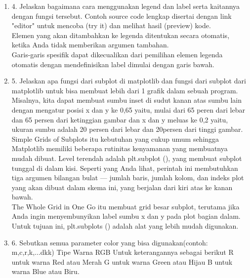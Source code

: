 \begin{enumerate}
\item 4. Jelaskan bagaimana cara menggunakan legend dan label serta kaitannya dengan fungsi tersebut.
Contoh source code lengkap disertai dengan link "editor" untuk mencoba (try it) dan melihat hasil (preview) kode.\\

Elemen yang akan ditambahkan ke legenda ditentukan secara otomatis, ketika Anda tidak memberikan argumen tambahan.\\

Garis-garis spesifik dapat dikecualikan dari pemilihan elemen legenda otomatis dengan mendefinisikan label dimulai dengan garis bawah.\\

\item 5. Jelaskan apa fungsi dari subplot di matplotlib dan fungsi dari subplot dari matplotlib untuk bisa membuat lebih dari 1 grafik dalam sebuah program.\\

Misalnya, kita dapat membuat sumbu inset di sudut kanan atas sumbu lain dengan mengatur posisi x dan y ke 0,65 yaitu, mulai dari 65 peren dari lebar dan 65 persen  dari ketinggian gambar dan x dan y meluas ke 0,2 yaitu, ukuran sumbu adalah 20 persen  dari lebar dan 20persen dari tinggi gambar.\\

Simple Grids of Subplots itu kebutuhan yang cukup umum sehingga Matplotlib memiliki beberapa rutinitas kenyamanan yang membuatnya mudah dibuat. Level terendah adalah plt.subplot (), yang membuat subplot tunggal di dalam kisi. Seperti yang Anda lihat, perintah ini membutuhkan tiga argumen bilangan bulat — jumlah baris, jumlah kolom, dan indeks plot yang akan dibuat dalam skema ini, yang berjalan dari kiri atas ke kanan bawah.\\

The Whole Grid in One Go itu  membuat grid besar subplot, terutama jika Anda ingin menyembunyikan label sumbu x dan y pada plot bagian dalam. Untuk tujuan ini, plt.subplots () adalah alat yang lebih mudah digunakan.\\

 
\item 6. Sebutkan semua parameter color yang bisa digunakan(contoh: m,c,r,k,...dkk)
Tipe Warna RGB
    Untuk keterangannya sebagai berikut
    R untuk warna Red atau Merah
    G untuk warna Green atau Hijau
    B untuk warna Blue atau Biru.\\
    

\end{enumerate}
